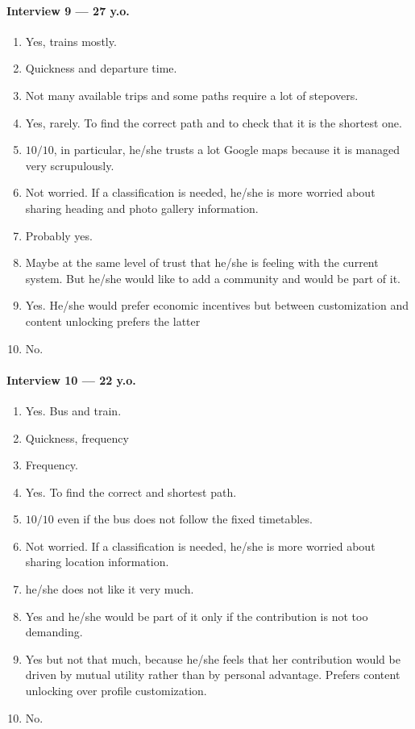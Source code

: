 \documentclass[a4paper, 11pt, twocolumn]{article}
\begin{document}
\paragraph*{Interview 9 --- 27 y.o.}

\begin{enumerate}
    \item Yes, trains mostly.
    \item Quickness and departure time.
    \item Not many available trips and some paths require a lot of stepovers.
    \item Yes, rarely. To find the correct path and to check that it is the shortest one.
    \item $10/10$, in particular, he/she trusts a lot Google maps because it is managed very scrupulously.
    \item Not worried. If a classification is needed, he/she is more worried about sharing heading and photo gallery information.
    \item Probably yes.
    \item Maybe at the same level of trust that he/she is feeling with the current system. But he/she would like to add a community and would be part of it.
    \item Yes. He/she would prefer economic incentives but between customization and content unlocking prefers the latter
    \item No.
\end{enumerate}

\paragraph*{Interview 10 --- 22 y.o.}
\begin{enumerate}
    \item Yes. Bus and train.
    \item Quickness, frequency
    \item Frequency.
    \item Yes. To find the correct and shortest path.
    \item $10/10$ even if the bus does not follow the fixed timetables.
    \item Not worried.  If a classification is needed, he/she is more worried about sharing location information.
    \item he/she does not like it very much.
    \item Yes and he/she would be part of it only if the contribution is not too demanding.
    \item Yes but not that much, because he/she feels that her contribution would be driven by mutual utility rather than by personal advantage. Prefers content unlocking over profile customization.
    \item No.
\end{enumerate}
\end{document}
